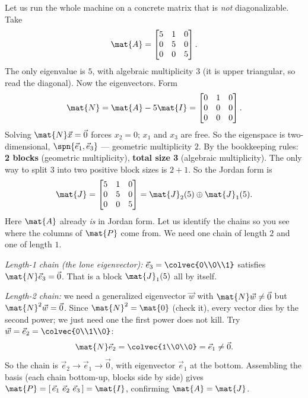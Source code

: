 Let us run the whole machine on a concrete matrix that is \emph{not} diagonalizable. Take
\[
\mat{A}=\begin{bmatrix}5&1&0\\0&5&0\\0&0&5\end{bmatrix}.
\]
The only eigenvalue is $5$, with algebraic multiplicity $3$ (it is upper triangular, so
read the diagonal). Now the eigenvectors. Form
\[
\mat{N}=\mat{A}-5\mat{I}=\begin{bmatrix}0&1&0\\0&0&0\\0&0&0\end{bmatrix}.
\]
Solving $\mat{N}\vec{x}=\vec{0}$ forces $x_2=0$; $x_1$ and $x_3$ are free. So the
eigenspace is two-dimensional, $\spn\{\vec{e}_1,\vec{e}_3\}$ --- geometric multiplicity
$2$. By the bookkeeping rules: \textbf{2 blocks} (geometric multiplicity), \textbf{total
size 3} (algebraic multiplicity). The only way to split $3$ into two positive block
sizes is $2+1$. So the Jordan form is
\[
\mat{J}=\begin{bmatrix}5&1&0\\0&5&0\\0&0&5\end{bmatrix}
=\mat{J}_2(5)\oplus\mat{J}_1(5).
\]
Here $\mat{A}$ already \emph{is} in Jordan form. Let us identify the chains so you see
where the columns of $\mat{P}$ come from. We need one chain of length $2$ and one of
length $1$.

\emph{Length-1 chain (the lone eigenvector):} $\vec{e}_3=\colvec{0\\0\\1}$ satisfies
$\mat{N}\vec{e}_3=\vec{0}$. That is a block $\mat{J}_1(5)$ all by itself.

\emph{Length-2 chain:} we need a generalized eigenvector $\vec{w}$ with
$\mat{N}\vec{w}\neq\vec{0}$ but $\mat{N}^2\vec{w}=\vec{0}$. Since $\mat{N}^2=\mat{0}$
(check it), every vector dies by the second power; we just need one the first power does
not kill. Try $\vec{w}=\vec{e}_2=\colvec{0\\1\\0}$:
\[
\mat{N}\vec{e}_2=\colvec{1\\0\\0}=\vec{e}_1\neq\vec{0}.
\]
So the chain is $\vec{e}_2\to\vec{e}_1\to\vec{0}$, with eigenvector $\vec{e}_1$ at the
bottom. Assembling the basis (each chain bottom-up, blocks side by side) gives
$\mat{P}=[\,\vec{e}_1\ \vec{e}_2\ \vec{e}_3\,]=\mat{I}$, confirming $\mat{A}=\mat{J}$.

